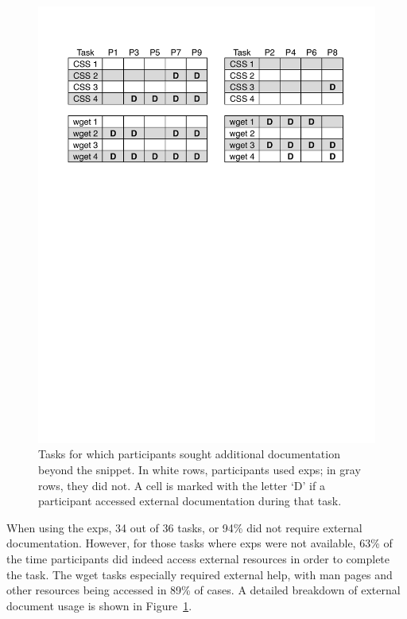 \begin{figure}
\centering
\includegraphics[width=\columnwidth]{figures/doc_accesses}
\caption{%
Tasks for which participants sought additional documentation beyond the snippet. In white rows, participants used \glspl{exp}; in gray rows, they did not.
A cell is marked with the letter `D' if a participant accessed external documentation during that task.
}
\label{fig:doc_accesses}
\end{figure}

When using the \glspl{exp}, 34 out of 36 tasks, or 94\% did not require external documentation.  However, for those tasks where \glspl{exp} were not available, 63\% of the time participants did indeed access external resources in order to complete the task.  The wget tasks especially required external help, with man pages and other resources being accessed in 89\% of cases.  
A detailed breakdown of external document usage is shown in Figure~\ref{fig:doc_accesses}. 



